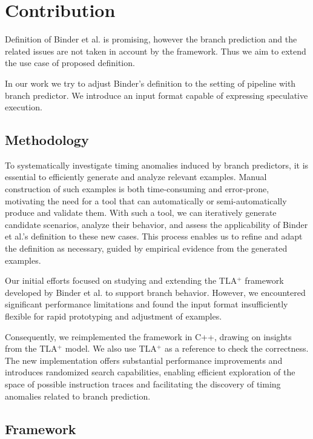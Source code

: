 \chapter{Contribution}

Definition of Binder et al. \cite{binder_definitions_2022} is promising, however the branch prediction and the related issues are not taken in account by the framework. Thus we aim to extend the use case of proposed definition.

In our work we try to adjust Binder's definition to the setting of pipeline with branch predictor. We introduce an input format capable of expressing speculative execution. 


\section{Methodology}
To systematically investigate timing anomalies induced by branch predictors, it is essential to efficiently generate and analyze relevant examples. Manual construction of such examples is both time-consuming and error-prone, motivating the need for a tool that can automatically or semi-automatically produce and validate them. With such a tool, we can iteratively generate candidate scenarios, analyze their behavior, and assess the applicability of Binder et al.'s definition to these new cases. This process enables us to refine and adapt the definition as necessary, guided by empirical evidence from the generated examples.

Our initial efforts focused on studying and extending the TLA$^+$ \cite{lamport_specifying_2003} framework developed by Binder et al.  to support branch behavior. However, we encountered significant performance limitations and found the input format insufficiently flexible for rapid prototyping and adjustment of examples.

Consequently, we reimplemented the framework in C++, drawing on insights from the TLA$^+$ model. We also use TLA$^+$ as a reference to check the correctness. The new implementation offers substantial performance improvements and introduces randomized search capabilities, enabling efficient exploration of the space of possible instruction traces and facilitating the discovery of timing anomalies related to branch prediction.

\section{Framework}

